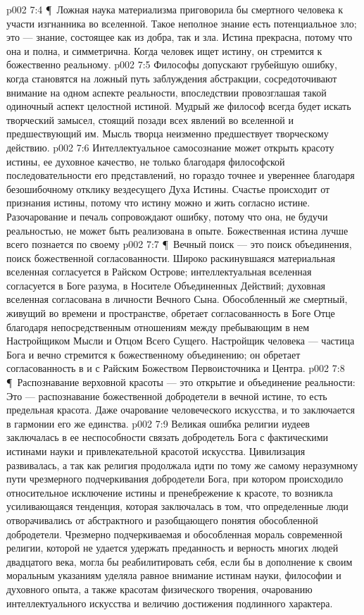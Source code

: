 \vs p002 7:4 \P\ Ложная наука материализма приговорила бы смертного человека к участи изгнанника во вселенной. Такое неполное знание есть потенциальное зло; это --- знание, состоящее как из добра, так и зла. Истина прекрасна, потому что она и полна, и симметрична. Когда человек ищет истину, он стремится к божественно реальному.
\vs p002 7:5 Философы допускают грубейшую ошибку, когда становятся на ложный путь заблуждения абстракции, сосредоточивают внимание на одном аспекте реальности, впоследствии провозглашая такой одиночный аспект целостной истиной. Мудрый же философ всегда будет искать творческий замысел, стоящий позади всех явлений во вселенной и предшествующий им. Мысль творца неизменно предшествует творческому действию.
\vs p002 7:6 Интеллектуальное самосознание может открыть красоту истины, ее духовное качество, не только благодаря философской последовательности его представлений, но гораздо точнее и увереннее благодаря безошибочному отклику вездесущего Духа Истины. Счастье происходит от признания истины, потому что истину можно  и жить согласно истине. Разочарование и печаль сопровождают ошибку, потому что она, не будучи реальностью, не может быть реализована в опыте. Божественная истина лучше всего познается по своему 
\vs p002 7:7 \P\ Вечный поиск --- это поиск объединения, поиск божественной согласованности. Широко раскинувшаяся материальная вселенная согласуется в Райском Острове; интеллектуальная вселенная согласуется в Боге разума, в Носителе Объединенных Действий; духовная вселенная согласована в личности Вечного Сына. Обособленный же смертный, живущий во времени и пространстве, обретает согласованность в Боге Отце благодаря непосредственным отношениям между пребывающим в нем Настройщиком Мысли и Отцом Всего Сущего. Настройщик человека --- частица Бога и вечно стремится к божественному объединению; он обретает согласованность в и с Райским Божеством Первоисточника и Центра.
\vs p002 7:8 \P\ Распознавание верховной красоты --- это открытие и объединение реальности: Это --- распознавание божественной добродетели в вечной истине, то есть предельная красота. Даже очарование человеческого искусства, и то заключается в гармонии его же единства.
\vs p002 7:9 Великая ошибка религии иудеев заключалась в ее неспособности связать добродетель Бога с фактическими истинами науки и привлекательной красотой искусства. Цивилизация развивалась, а так как религия продолжала идти по тому же самому неразумному пути чрезмерного подчеркивания добродетели Бога, при котором происходило относительное исключение истины и пренебрежение к красоте, то возникла усиливающаяся тенденция, которая заключалась в том, что определенные люди отворачивались от абстрактного и разобщающего понятия обособленной добродетели. Чрезмерно подчеркиваемая и обособленная мораль современной религии, которой не удается удержать преданность и верность многих людей двадцатого века, могла бы реабилитировать себя, если бы в дополнение к своим моральным указаниям уделяла равное внимание истинам науки, философии и духовного опыта, а также красотам физического творения, очарованию интеллектуального искусства и величию достижения подлинного характера.
